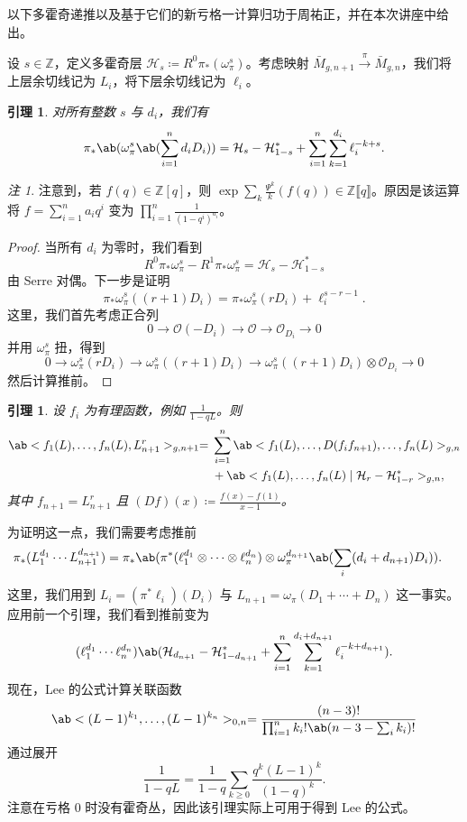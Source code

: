 \documentclass{amsart}
\newtheorem{lem}[thm]{引理}
\theoremstyle{definition}
\theoremstyle{remark}
\newtheorem{rmk}[thm]{注}
\theoremstyle{plain}
\theoremstyle{definition}
\theoremstyle{remark}
\newcommand{\Z}{\mathbb{Z}}
\newcommand{\mc}[1]{\mathcal{#1}}
\newcommand{\1}{\mathbf{1}}
\newcommand{\2}{\mathbf{2}}
\newcommand{\3}{\mathbf{3}}
\newcommand{\ps}[1]{\llbracket #1 \rrbracket}
\begin{document}
以下多霍奇递推以及基于它们的新亏格一计算归功于周祐正，并在本次讲座中给出。

设 \(s \in \Z\)，定义多霍奇层 \(\mc{H}_s \coloneqq R^0 \pi_* (\omega_{\pi}^s)\)。考虑映射 \(\bar{M}_{g,n+1} \xrightarrow{\pi} \bar{M}_{g,n}\)，我们将上层余切线记为 \(L_i\)，将下层余切线记为 \(\ell_i\)。

\begin{lem}
    对所有整数 \(s\) 与 \(d_i\)，我们有
    \[ \pi_*\ab(\omega_{\pi}^s\ab(\sum_{i=1}^n d_i D_i)) = \mc{H}_s-\mc{H}_{1-s}^* + \sum_{i=1}^n \sum_{k=1}^{d_i} \ell_i^{-k+s}. \]
\end{lem}

\begin{rmk}
    注意到，若 \(f(q) \in \Z[q]\)，则 \(\exp \sum_k \frac{\Psi^k}{k} (f(q)) \in \Z \ps{q}\)。原因是该运算将 \(f = \sum_{i=1}^{n} a_i q^i\) 变为 \(\prod_{i=1}^n \frac{1}{(1-q^i)^{a_i}}\)。
\end{rmk}

\begin{proof}
    当所有 \(d_i\) 为零时，我们看到
    \[ R^0 \pi_* \omega_{\pi}^s - R^1 \pi_* \omega_{\pi}^s = \mc{H}_s - \mc{H}_{1-s}^* \]
    由 Serre 对偶。下一步是证明
    \[ \pi_* \omega_{\pi}^s ((r+1)D_i) = \pi_* \omega_{\pi}^s(r D_i) + \ell_i^{s-r-1}. \]
    这里，我们首先考虑正合列
    \[ 0 \to \mc{O} (-D_i) \to \mc{O} \to \mc{O}_{D_i} \to 0 \]
    并用 \(\omega_{\pi}^s\) 扭，得到
    \[ 0 \to \omega_{\pi}^s(r D_i) \to \omega_{\pi}^s ((r+1)D_i) \to \omega_{\pi}^s ((r+1)D_i) \otimes \mc{O}_{D_i} \to 0 \]
    然后计算推前。
\end{proof}

\begin{lem}
    设 \(f_i\) 为有理函数，例如 \(\frac{1}{1-q L}\)。则
    \begin{align*}
        \ab<f_1(L), \ldots, f_n(L), L_{n+1}^r>_{g, n+1} ={}& \sum_{i=1}^n \ab<f_1(L), \ldots, D(f_i f_{n+1}), \ldots, f_n(L)>_{g, n} \\
        &+ \ab<f_1(L), \ldots, f_n(L) \mid \mc{H}_r - \mc{H}_{1-r}^*>_{g,n},
    \end{align*}
    其中 \(f_{n+1} = L_{n+1}^r\) 且 \((Df)(x) \coloneqq \frac{f(x)-f(1)}{x-1}\)。
\end{lem}

为证明这一点，我们需要考虑推前
\begin{align*}
    \pi_* (L_1^{d_1} \cdots L_{n+1}^{d_{n+1}}) &= \pi_* \ab(\pi^*(\ell_1^{d_1} \otimes \cdots \otimes \ell_n^{d_n}) \otimes \omega_{\pi}^{d_{n+1}}\ab(\sum_i (d_i+d_{n+1})D_i)).
\end{align*}
这里，我们用到 \(L_i = (\pi^* \ell_i)(D_i)\) 与 \(L_{n+1} = \omega_{\pi}(D_1 + \cdots + D_n)\) 这一事实。应用前一个引理，我们看到推前变为
\[ (\ell_1^{d_1} \cdots \ell_n^{d_n})\ab(\mc{H}_{d_{n+1}} - \mc{H}_{1-d_{n+1}}^* + \sum_{i=1}^n \sum_{k=1}^{d_i + d_{n+1}} \ell_i^{-k+d_{n+1}}). \]
现在，Lee 的公式计算关联函数
\[ \ab<(L-1)^{k_1}, \ldots, (L-1)^{k_n}>_{0,n} = \frac{(n-3)!}{\prod_{i=1}^n k_i! \ab(n-3-\sum_i k_i)!} \]
通过展开
\[ \frac{1}{1-qL} = \frac{1}{1-q} \sum_{k \geq 0} \frac{q^k(L-1)^k}{(1-q)^k}. \]
注意在亏格 \(0\) 时没有霍奇丛，因此该引理实际上可用于得到 Lee 的公式。
\end{document}
